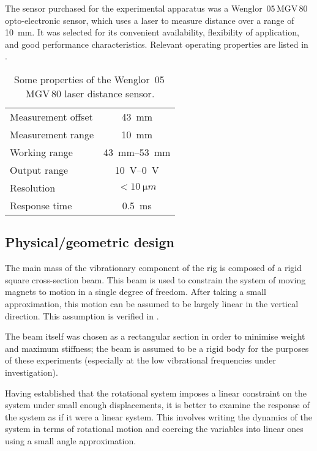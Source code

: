 The sensor purchased for the experimental apparatus was a Wenglor~05\,MGV\,80
opto-electronic sensor, which uses a laser to measure distance over a
range of \SI{10}{mm}. It was selected for its convenient availability,
flexibility of application, and good performance characteristics.
Relevant operating properties are listed in .

\begin{table}
  \caption{Some properties of the Wenglor~05\,MGV\,80 laser distance sensor.}
  \begin{tabular}{@{}lc@{}}
    \toprule
    Measurement offset & \SI{43}{mm} \\
    Measurement range & \SI{10}{mm} \\
    \midrule
    Working range & \SI{43}{mm}--\SI{53}{mm} \\
    Output range & \SI{10}{V}--\SI{0}{V} \\
    \midrule
    Resolution & $<\SI{10}{\micro m}$ \\
    Response time & \SI{0.5}{ms} \\
    \bottomrule
  \end{tabular}
\end{table}

\subsection{Physical/geometric design}

The main mass of the vibrationary component of the rig is composed of a
rigid square cross-section beam. This beam is used to constrain the system
of moving magnets to motion in a single degree of freedom. After taking a small
approximation, this motion can be assumed to be largely linear in the vertical
direction. This assumption is verified in .

The beam itself was chosen as a rectangular section in order to minimise
weight and maximum stiffness; the beam is assumed to be a rigid body for the
purposes of these experiments (especially at the low vibrational frequencies 
under investigation).

Having established that the rotational system imposes a linear constraint on
the system under small enough displacements, it is better to examine the
response of the system as if it were a linear system. This involves writing
the dynamics of the system in terms of rotational motion and coercing the
variables into linear ones using a small angle approximation.

